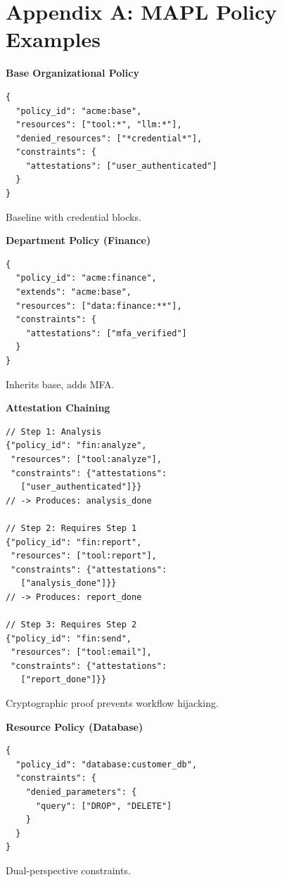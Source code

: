 \appendix
\section*{Appendix A: MAPL Policy Examples}
\label{appendix:policy-examples}

{\small
\noindent\begin{minipage}[t]{0.48\columnwidth}
\textbf{Base Organizational Policy}
\begin{lstlisting}[basicstyle=\ttfamily\scriptsize]
{
  "policy_id": "acme:base",
  "resources": ["tool:*", "llm:*"],
  "denied_resources": ["*credential*"],
  "constraints": {
    "attestations": ["user_authenticated"]
  }
}
\end{lstlisting}
Baseline with credential blocks.
\end{minipage}
\hfill
\begin{minipage}[t]{0.48\columnwidth}
\textbf{Department Policy (Finance)}
\begin{lstlisting}[basicstyle=\ttfamily\scriptsize]
{
  "policy_id": "acme:finance",
  "extends": "acme:base",
  "resources": ["data:finance:**"],
  "constraints": {
    "attestations": ["mfa_verified"]
  }
}
\end{lstlisting}
Inherits base, adds MFA.
\end{minipage}

\vspace{0.5em}
\noindent\begin{minipage}[t]{0.48\columnwidth}
\textbf{Attestation Chaining}
\begin{lstlisting}[basicstyle=\ttfamily\scriptsize]
// Step 1: Analysis
{"policy_id": "fin:analyze",
 "resources": ["tool:analyze"],
 "constraints": {"attestations":
   ["user_authenticated"]}}
// -> Produces: analysis_done

// Step 2: Requires Step 1
{"policy_id": "fin:report",
 "resources": ["tool:report"],
 "constraints": {"attestations":
   ["analysis_done"]}}
// -> Produces: report_done

// Step 3: Requires Step 2
{"policy_id": "fin:send",
 "resources": ["tool:email"],
 "constraints": {"attestations":
   ["report_done"]}}
\end{lstlisting}
Cryptographic proof prevents workflow hijacking.
\end{minipage}
\hfill
\begin{minipage}[t]{0.48\columnwidth}
\textbf{Resource Policy (Database)}
\begin{lstlisting}[basicstyle=\ttfamily\scriptsize]
{
  "policy_id": "database:customer_db",
  "constraints": {
    "denied_parameters": {
      "query": ["DROP", "DELETE"]
    }
  }
}
\end{lstlisting}
Dual-perspective constraints.
\end{minipage}

}

